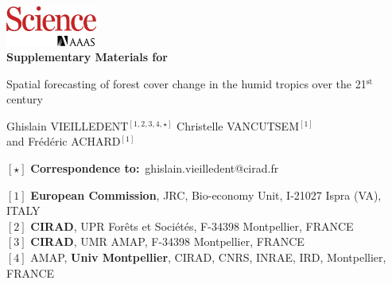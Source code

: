\renewcommand{\bibsection}{}  %

\begin{center}
  \includegraphics[width=3cm]{figures/Science_logo.png}\\
  \vspace{0.5cm}
  \Large{\textbf{Supplementary Materials for}}
\end{center}

\vspace{1cm}

\begin{center}
  \LARGE{Spatial forecasting of forest cover change in the humid tropics over the 21$^{\text{st}}$ century}
\end{center}

\vspace{1cm}

\begin{center}
  \large{
  Ghislain VIEILLEDENT$^{[1, 2, 3, 4, \star]}$ \hspace{0.5cm} Christelle VANCUTSEM$^{[1]}$\\
  \vspace{0.5cm}
  and \hspace{0.5cm} Frédéric ACHARD$^{[1]}$
  }
\end{center}

\vspace{0.5cm}

\begin{center}
  $[\star]$ \textbf{Correspondence to:}~ghislain.vieilledent@cirad.fr\\
\end{center}

\vspace{0.5cm}

{\small
  \begin{flushleft}
    $[1]$ \textbf{European Commission}, JRC, Bio-economy Unit, I-21027 Ispra (VA), ITALY\\
    $[2]$ \textbf{CIRAD}, UPR Forêts et Sociétés, F-34398 Montpellier, FRANCE\\
    $[3]$ \textbf{CIRAD}, UMR AMAP, F-34398 Montpellier, FRANCE\\
    $[4]$ AMAP, \textbf{Univ Montpellier}, CIRAD, CNRS, INRAE, IRD, Montpellier, FRANCE\\
  \end{flushleft}}

